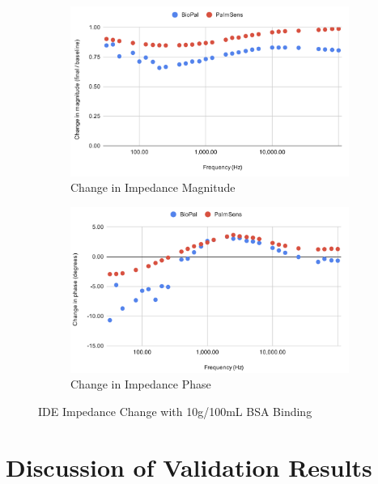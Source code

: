 \begin{figure}[H]
    \centering
    \begin{subfigure}{0.48\textwidth}
        \includegraphics[width=\textwidth]{10g:100mL mag.png}   
        \caption{Change in Impedance Magnitude}
        \label{fig:10g_mag}
    \end{subfigure}
    \hfill
    \begin{subfigure}{0.48\textwidth}
        \includegraphics[width=\textwidth]{10g:100mL phase.png}
        \caption{Change in Impedance Phase}
        \label{fig:10g_phase}
    \end{subfigure}
    \caption{IDE Impedance Change with 10g/100mL BSA Binding}
    \label{fig:10g_bsa_comparison}
\end{figure}

\section{Discussion of Validation Results}

